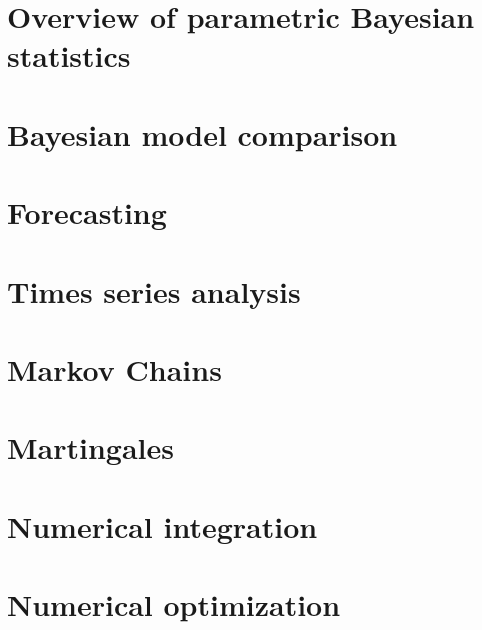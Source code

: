 \documentclass[12pt]{report}
\theoremstyle{definition}
\begin{document}
\chapter{Overview of parametric Bayesian statistics}
\label{chap:bayesian-overview}

\chapter{Bayesian model comparison}
\label{chap:model-comparison}

\chapter{Forecasting}
\label{chap:forecasting}

\chapter{Times series analysis}
\label{chap:time-series-analysis}

\chapter{Markov Chains}
\label{chap:markov-chains}

\chapter{Martingales}
\label{chap:martingales}

\chapter{Numerical integration}
\label{chap:numerical-integration}

\chapter{Numerical optimization}
\label{chap:numerical-optmization}

%
\end{document}

